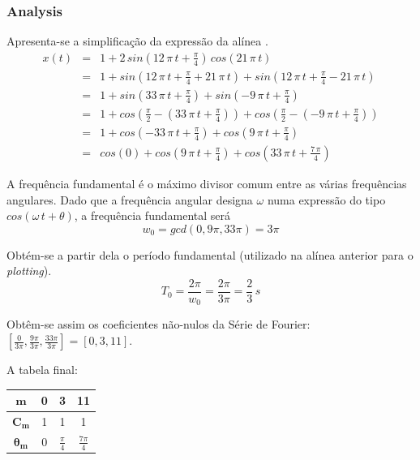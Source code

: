 \documentclass[a4paper]{article}
\begin{document}
\subsubsection{ Analysis}
\noindent Apresenta-se a simplificação da expressão da alínea \emph{}.
\begin{eqnarray}
	x(t) & = & 1 + 2 \, sin\left(12 \, \pi \, t + \frac{\pi}{4}\right) \, cos(21 \, \pi \, t) \\
	& = & 1 + sin\left(12 \, \pi \, t + \frac{\pi}{4} + 21 \, \pi \, t\right) + sin\left(12 \, \pi \, t + \frac{\pi}{4} - 21 \, \pi \, t\right) \\
	& = & 1 + sin\left(33 \, \pi \, t + \frac{\pi}{4}\right) + sin\left(-9 \, \pi \, t + \frac{\pi}{4}\right) \\
	& = & 1 + cos\left(\frac{\pi}{2} - \left(33 \, \pi \, t + \frac{\pi}{4}\right)\right) + cos\left(\frac{\pi}{2} - \left(-9 \, \pi \, t + \frac{\pi}{4}\right)\right) \\
	& = & 1 + cos\left(- 33 \, \pi \, t + \frac{\pi}{4}\right) + cos\left(9 \, \pi \, t + \frac{\pi}{4}\right) \\
	& = & cos(0) + cos\left(9 \, \pi \, t + \frac{\pi}{4}\right) + cos\left(33 \, \pi \, t + \frac{7 \, \pi}{4}\right)
\end{eqnarray}

\noindent A frequência fundamental é o máximo divisor comum entre as várias frequências angulares. Dado que a frequência angular designa $\omega$ numa expressão do tipo $cos(\omega \, t + \theta)$, a frequência fundamental será
\begin{equation}
	w_0 = gcd(0, 9 \pi, 33 \pi) = 3 \pi
\end{equation}

\noindent Obtém-se a partir dela o período fundamental (utilizado na alínea anterior para o \emph{plotting}).
\begin{equation}
	T_0 = \frac{2 \pi}{w_0} = \frac{2 \pi}{3 \pi} = \frac{2}{3} \, s
\end{equation}

\noindent Obtêm-se assim os coeficientes não-nulos da Série de Fourier: $\left[\frac{0}{3 \pi}, \frac{9 \pi}{3 \pi}, \frac{33 \pi}{3 \pi}\right] = [0, 3, 11]$.

\noindent A tabela final:

\begin{center}
	\begin{tabular}{|c|c|c|c|}
		\hline
		$\mathbf{m}$ & 0 & 3 & 11 \\
		\hline
		$\mathbf{C_m}$ & 1 & 1 & 1 \\
		\hline
		$\mathbf{\theta_m}$ & 0 & $\frac{\pi}{4}$ & $\frac{7 \pi}{4}$ \\
		\hline
	\end{tabular}
	\label{tab:ex_2_1_3}
\end{center}
\end{document}

